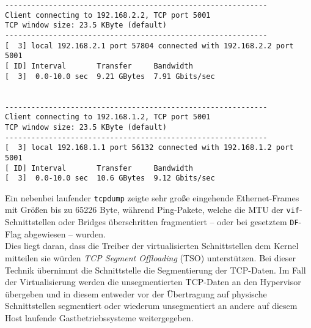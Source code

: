 \begin{verbatim}
------------------------------------------------------------
Client connecting to 192.168.2.2, TCP port 5001
TCP window size: 23.5 KByte (default)
------------------------------------------------------------
[  3] local 192.168.2.1 port 57804 connected with 192.168.2.2 port 5001
[ ID] Interval       Transfer     Bandwidth
[  3]  0.0-10.0 sec  9.21 GBytes  7.91 Gbits/sec


------------------------------------------------------------
Client connecting to 192.168.1.2, TCP port 5001
TCP window size: 23.5 KByte (default)
------------------------------------------------------------
[  3] local 192.168.1.1 port 56132 connected with 192.168.1.2 port 5001
[ ID] Interval       Transfer     Bandwidth
[  3]  0.0-10.0 sec  10.6 GBytes  9.12 Gbits/sec
\end{verbatim}
Ein nebenbei laufender \verb#tcpdump# zeigte sehr große eingehende Ethernet-Frames mit Größen bis zu 65226 Byte, während Ping-Pakete, welche die MTU der \verb#vif#-Schnittstellen oder Bridges überschritten fragmentiert -- oder bei gesetztem \verb#DF#-Flag abgewiesen -- wurden.\\
Dies liegt daran, dass die Treiber der virtualisierten Schnittstellen dem Kernel mitteilen sie würden \emph{TCP Segment Offloading} (TSO) unterstützen. Bei dieser Technik übernimmt die Schnittstelle die Segmentierung der TCP-Daten. Im Fall der Virtualisierung werden die unsegmentierten TCP-Daten an den Hypervisor übergeben und in diesem entweder vor der Übertragung auf physische Schnittstellen segmentiert oder wiederum unsegmentiert an andere auf diesem Host laufende Gastbetriebssysteme weitergegeben.
\setupVerbatimOut
{}
